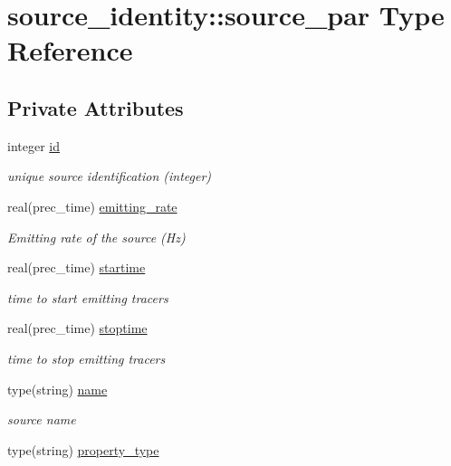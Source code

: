 \hypertarget{structsource__identity_1_1source__par}{}\section{source\+\_\+identity\+:\+:source\+\_\+par Type Reference}
\label{structsource__identity_1_1source__par}
\subsection*{Private Attributes}
\begin{DoxyCompactItemize}
\item 
integer \mbox{\hyperlink{structsource__identity_1_1source__par_a05b6d325908a1b552f98dada275a3465}{id}}
\begin{DoxyCompactList}\small\item\em unique source identification (integer) \end{DoxyCompactList}\item 
real(prec\+\_\+time) \mbox{\hyperlink{structsource__identity_1_1source__par_a746a02960ffcba9f699ae45fa55dd8b4}{emitting\+\_\+rate}}
\begin{DoxyCompactList}\small\item\em Emitting rate of the source (Hz) \end{DoxyCompactList}\item 
real(prec\+\_\+time) \mbox{\hyperlink{structsource__identity_1_1source__par_a11cd864db9e9021cec4bd018d6fec295}{startime}}
\begin{DoxyCompactList}\small\item\em time to start emitting tracers \end{DoxyCompactList}\item 
real(prec\+\_\+time) \mbox{\hyperlink{structsource__identity_1_1source__par_a3ab5e22242b41bdcd56480b9d0496efa}{stoptime}}
\begin{DoxyCompactList}\small\item\em time to stop emitting tracers \end{DoxyCompactList}\item 
type(string) \mbox{\hyperlink{structsource__identity_1_1source__par_a71ef7dc8c6268d014247e0bca3005311}{name}}
\begin{DoxyCompactList}\small\item\em source name \end{DoxyCompactList}\item 
type(string) \mbox{\hyperlink{structsource__identity_1_1source__par_a3d7091aedcb1154665c1debba07bee2c}{property\+\_\+type}}

\end{DoxyCompactItemize}
